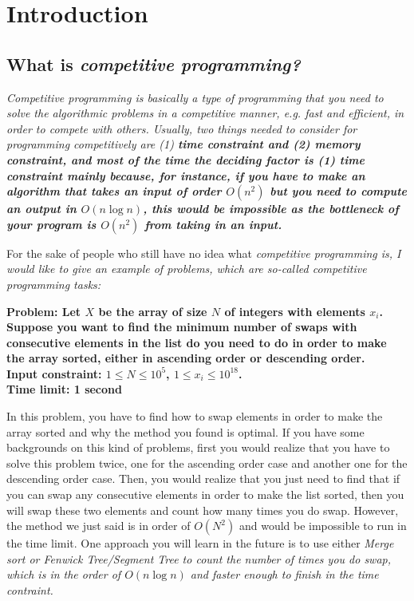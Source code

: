 \chapter{Introduction}
\minitoc

\section{What is \it{competitive programming}?}

\it{Competitive programming} is basically a type of programming that you need to solve the algorithmic problems in a competitive manner, e.g. fast and efficient, in order to compete with others. Usually, two things needed to consider for programming competitively are (1) \bf{time constraint} and (2) \bf{memory constraint}, and most of the time the deciding factor is (1) time constraint mainly because, for instance, if you have to make an algorithm that takes an input of order $O(n^2)$ but you need to compute an output in $O(n \log n)$, this would be impossible as the bottleneck of your program is $O(n^2)$ from taking in an input.

For the sake of people who still have no idea what \it{competitive programming} is, I would like to give an example of problems, which are so-called competitive programming tasks:

\begin{flushleft}
	\bf{Problem: } Let $X$ be the array of size $N$ of integers with elements $x_i$. Suppose you want 	to find the minimum number of swaps with consecutive elements in the list do you need to do in order to make the array sorted, either in ascending order or descending order. \\
	\bf{Input constraint:} $1 \le N \le 10^5$, $1 \le x_i \le 10^{18}$. \\
	\bf{Time limit:} 1 second
\end{flushleft}

In this problem, you have to find how to swap elements in order to make the array sorted and why the method you found is optimal. If you have some backgrounds on this kind of problems, first you would realize that you have to solve this problem twice, one for the ascending order case and another one for the descending order case. Then, you would realize that you just need to find that if you can swap any consecutive elements in order to make the list sorted, then you will swap these two elements and count how many times you do swap. However, the method we just said is in order of $O(N^2)$ and would be impossible to run in the time limit. One approach you will learn in the future is to use either \it{Merge sort} or \it{Fenwick Tree/Segment Tree} to count the number of times you do swap, which is in the order of $O(n \log n)$ and faster enough to finish in the time contraint.


